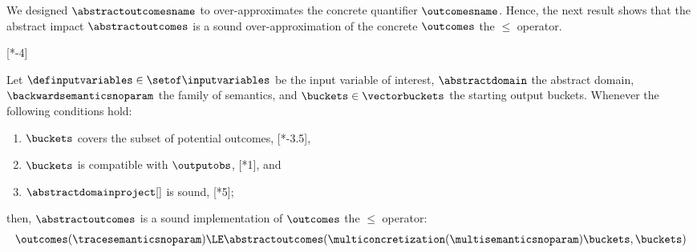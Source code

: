 We designed $\abstractoutcomesname$ to over-approximates the concrete quantifier $\outcomesname$.
Hence, the next result shows that the abstract impact $\abstractoutcomes$ is a sound over-approximation of the concrete $\outcomes$ \wrt{} the $\le$ operator.

[*-4]
\begin{lemma}
  Let $\definputvariables\in\setof\inputvariables$ be the input variable of interest, $\abstractdomain$ the abstract domain, $\backwardsemanticsnoparam$ the family of semantics, and $\buckets\in\vectorbuckets$ the starting output buckets.
  Whenever the following conditions hold:
  \begin{enumerate}[label=(\roman*)]
    \item \label{proof:b2} $\buckets$ covers the subset of potential outcomes, \cf{} [*-3.5],
    \item \label{proof:b1} $\buckets$ is compatible with $\outputobs$, \cf{} [*1], and
    \item \label{proof:d} $\abstractdomainproject[]$ is sound, \cf{} [*5];
  \end{enumerate}
  then, $\abstractoutcomes$ is a sound implementation of $\outcomes$ \wrt{} the $\le$ operator:
  \begin{align*}
    \outcomes(\tracesemanticsnoparam) \LE \abstractoutcomes(\multiconcretization(\multisemanticsnoparam)\buckets, \buckets)
  \end{align*}
\end{lemma}
